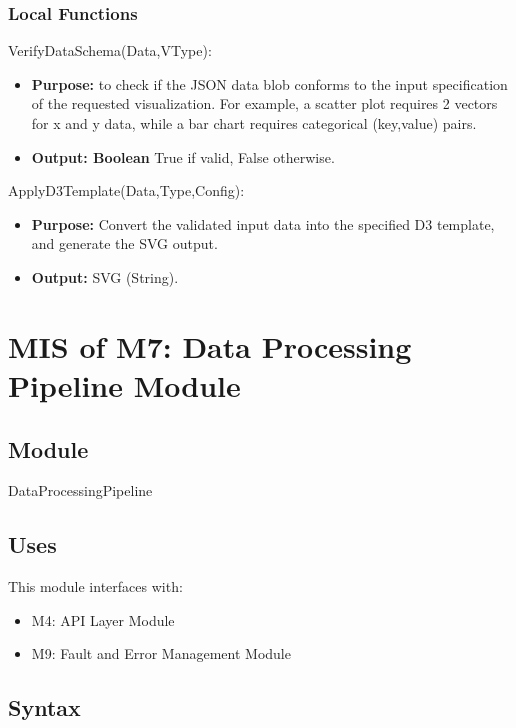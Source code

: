 \documentclass[12pt, titlepage]{article}
\begin{document}
\subsubsection{Local Functions}

\noindent VerifyDataSchema(Data,VType):

\begin{itemize}
  \item \textbf{Purpose:} to check if the JSON data blob conforms to the input specification of the requested visualization. For example, a scatter plot requires 2 vectors for x and y data, while a bar chart requires categorical (key,value) pairs.
  \item \textbf{Output: Boolean} True if valid, False otherwise.  
\end{itemize}

\noindent ApplyD3Template(Data,Type,Config):

\begin{itemize}
  \item \textbf{Purpose:} Convert the validated input data into the specified D3 template, and generate the SVG output. 
  \item \textbf{Output:} SVG (String). 
\end{itemize}


\section{MIS of M7: Data Processing Pipeline Module} \label{Module 7} 

\subsection{Module}

DataProcessingPipeline

\subsection{Uses}
This module interfaces with:

\begin{itemize}
    \item M4: API Layer Module
    \item M9: Fault and Error Management Module
\end{itemize}

\subsection{Syntax}
\end{document}
